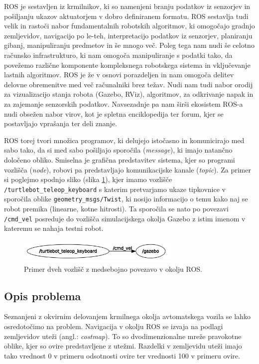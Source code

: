 \documentclass[10pt,a4paper]{article}
\begin{document}
ROS je sestavljen iz krmilnikov, ki so namenjeni branju podatkov iz senzorjev in pošiljanju ukazov aktuatorjem v dobro definiranem formatu. ROS sestavlja tudi velik in rastoči nabor fundamentalnih robotskih algoritmov, ki omogočajo gradnjo zemljevidov, navigacijo po le-teh, interpretacijo podatkov iz senzorjev, planiranju gibanj, manipuliranju predmetov in še mnogo več. Poleg tega nam nudi še celotno računsko infrastrukturo, ki nam omogoča manipuliranje s podatki tako, da povežemo različne komponente kompleksnega robotskega sistema in vključevanje lastnih algoritmov. ROS je že v osnovi porazdeljen in nam omogoča delitev delovne obremenitve med več računalniki brez težav. Nudi nam tudi nabor orodij za vizualizacijo stanja robota (Gazebo, RViz), algoritmov, za odkrivanje napak in za zajemanje senzorskih podatkov. Navsezadnje pa nam širši ekosistem ROS-a nudi obsežen nabor virov, kot je spletna enciklopedija ter forum, kjer se postavljajo vprašanja ter deli znanje.

ROS torej tvori množica programov, ki delujejo istočasno in komunicirajo med sabo tako, da si med sabo pošiljajo sporočila (\textit{message}), ki imajo natančno določeno obliko. Smiselna je grafična predstavitev sistema, kjer so programi vozlišča (\textit{node}), robovi pa predstavljajo komunikacijske kanale (\textit{topic}). Za primer si poglejmo spodnjo sliko (slika \ref{fig:sl1}), kjer imamo vozlišče \verb|/turtlebot_teleop_keyboard| s katerim pretvarjamo ukaze tipkovnice v sporočila oblike \verb|geometry_msgs/Twist|, ki nosijo informacijo o temu kako naj se robot premika (linearne, kotne hitrosti). Ta sporočila se nato po povezavi \verb|/cmd_vel| posreduje do vozlišča simulacijskega okolja Gazebo z istim imenom v kateremu se nahaja testni robot.

\begin{figure}[H]
	\centering
	\includegraphics[width=8cm]{pic/ros.png}
	\caption{Primer dveh vozlišč z medsebojno povezavo v okolju ROS.}
	\label{fig:sl1}
\end{figure}

\subsection{Opis problema}

Seznanjeni z okvirnim delovanjem krmilnega okolja avtomatskega vozila se lahko osredotočimo na problem. Navigacija v okolju ROS se izvaja na podlagi zemljevidov uteži (angl.: \textit{costmap}). To so dvodimenzionalne mreže pravokotne oblike, kjer so ovire predstavljene z utežmi. Razdelki v zemljevidu uteži imajo tako vrednost 0 v primeru odsotnosti ovire ter vrednosti 100 v primeru ovire.
\end{document}
